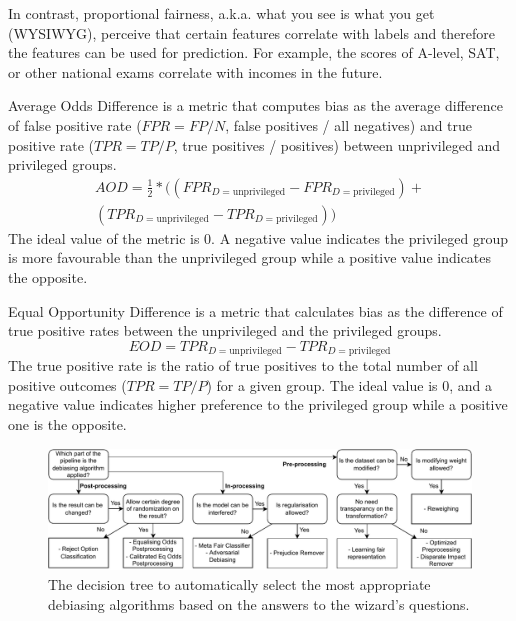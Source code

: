 \documentclass[sigconf,review]{acmart}
\begin{document}
In contrast, proportional fairness, a.k.a. what you see is what you get (WYSIWYG),  perceive that certain features correlate with labels and therefore the features can be used for prediction. For example, the scores of A-level, SAT, or other national exams correlate with incomes in the future.

Average Odds Difference \cite{bellamy2018ai} is a metric that computes bias as the average difference of false positive rate ($FPR = FP/N$, false positives / all negatives) and true positive rate ($TPR = TP/P$, true positives / positives) between unprivileged and privileged groups.
\begin{equation}
	\begin{aligned}
		AOD = \tfrac{1}{2}* ((FPR_{D = \text{unprivileged}} - FPR_{D = \text{privileged}}) +\\
		(TPR_{D = \text{unprivileged}} - TPR_{D = \text{privileged}}))
	\end{aligned}
\end{equation}
The ideal value of the metric is 0. A negative value indicates the privileged group is more favourable than the unprivileged group while a positive value indicates the opposite. 




Equal Opportunity Difference \cite{bellamy2018ai} is a metric that calculates bias as the difference of true positive rates between the unprivileged and the privileged groups. 
\begin{equation}
	EOD = TPR_{D = \text{unprivileged}} - TPR_{D = \text{privileged}}	
\end{equation}
The true positive rate is the ratio of true positives to the total number of all positive outcomes ($TPR=TP/P$) for a given group. The ideal value is 0, and a negative value indicates higher preference to the privileged group while a positive one is the opposite.



\begin{figure}
	\includegraphics[width=\linewidth]{figures/wizard-debiasing}
	\caption{The decision tree to automatically select the most appropriate debiasing algorithms based on the answers to the wizard's questions.}
	\label{fig:wizard-debiasing}
\end{figure}
\end{document}
